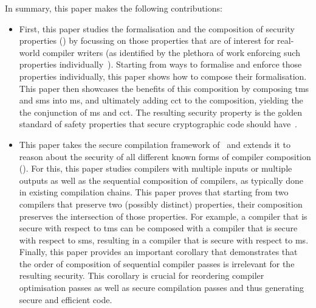 \documentclass[utf8,acmsmall,review,screen,dvipsnames,anonymous]{acmart}
\begin{document}
In summary, this paper makes the following contributions:
\begin{itemize}
  \item %
        First, this paper studies the formalisation and the composition of security properties () by focussing on those properties that are of interest for real-world compiler writers (as identified by the plethora of work enforcing such properties individually~\cite{akritidis2009baggy,nagarakatte2009soft,nagarakatte2010cets,dhumbumroong2020boundwarden,jung2021pico,nam2019framer,shankaranarayana2023tailcheck,younan2010paricheck,zhou2023fatptrs,bond2017vale,almeida2017jasmin,kuepper2023cryptopt,cauligi2019fact}).
        Starting from ways to formalise and enforce those properties individually, this paper shows how to compose their formalisation.
        This paper then showcases the benefits of this composition by composing \gls{tms} and \gls{sms} into \gls{ms}, and ultimately adding \gls{cct} to the composition, yielding the the conjunction of \gls{ms} and \gls{cct}.
        The resulting security property is the golden standard of safety properties that secure cryptographic code should have~\cite{lemay2021ccc}.

  \item %
        This paper takes the secure compilation framework of~\citep{abate2019jour} and extends it to reason about the security of all different known forms of compiler composition ().
        For this, this paper studies compilers with multiple inputs or multiple outputs as well as the sequential composition of compilers, as typically done in existing compilation chains.
        This paper proves that starting from two compilers that preserve two (possibly distinct) properties, their composition preserves the intersection of those properties.
        For example, a compiler that is secure with respect to \gls{tms} can be composed with a compiler that is secure with respect to \gls{sms}, resulting in a compiler that is secure with respect to \gls{ms}.
        Finally, this paper provides an important corollary that demonstrates that the order of composition of sequential compiler passes is irrelevant for the resulting security.
        This corollary is crucial for reordering compiler optimisation passes as well as secure compilation passes and thus generating secure and efficient code.


\end{itemize}
\end{document}
